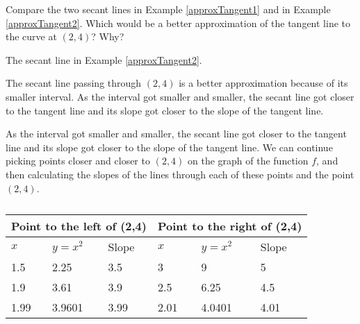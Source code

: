 \begin{example}\label{approxTangent3}
Compare the two secant lines in Example \ref{approxTangent1} and in Example \ref{approxTangent2}.  Which would be a better approximation of the tangent line to the curve at 
$(2,4)$? Why?\\
    \begin{sol}
    The secant line in Example \ref{approxTangent2}.
    \end{sol}
    \begin{solL}
    The secant line passing through $(2,4)$ is a better approximation because of its smaller interval. As the interval got smaller and smaller, the secant line got closer to the tangent line and its slope got closer to the slope of the tangent line.  
    
    \end{solL}
\end{example}
\vspace{0.8in}

\noindent As the interval got smaller and smaller, the secant line got closer to the tangent line and its slope got closer to the slope of the tangent line.  We can continue picking points closer and closer to $(2,4)$ on the graph of  the function $f$, and then calculating the slopes of the lines through each of these points and the point $(2,4)$. 
\vspace{-0.25cm}
\begin{table}[H]
\begin{center}
\begin{tabular}{ |p{2cm}|p{2cm}|p{2cm}|p{2cm}|p{2cm}|p{2cm}| }
 \hline
 \multicolumn{3}{|c|}{Point to the left of (2,4)}& \multicolumn{3}{c|}{Point to the right of (2,4)} \\

\hline

$x$ & $y=x^2$& Slope &$x$ & $y=x^2$& Slope   \\
\hline
1.5 & 2.25 & 3.5 & 3 & 9 & 5  \\
\hline
1.9 & 3.61 & 3.9 & 2.5 & 6.25 & 4.5  \\
\hline
1.99 & 3.9601 & 3.99 & 2.01 & 4.0401 & 4.01  \\

\hline
\end{tabular}
\caption{}
\label{table:exTangSlope}
\end{center}

\end{table}

